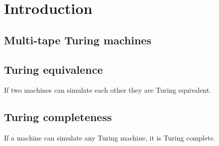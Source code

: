 
\section{Introduction}

\subsection{Multi-tape Turing machines}

\subsection{Turing equivalence}

If two machines can simulate each other they are Turing equivalent.

\subsection{Turing completeness}

If a machine can simulate any Turing machine, it is Turing complete.
